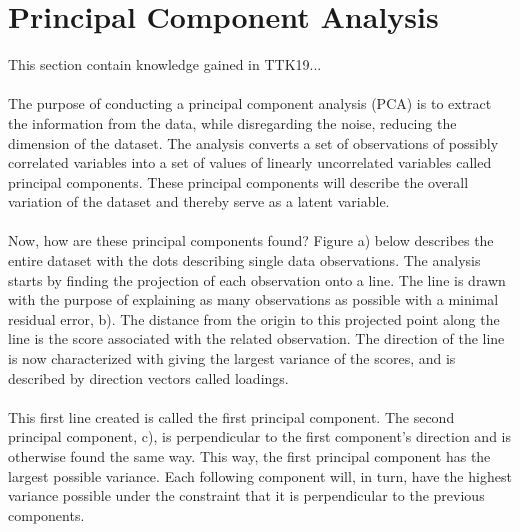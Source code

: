 \section{Principal Component Analysis} \label{sec:pca}
This section contain knowledge gained in TTK19...
\\\\
The purpose of conducting a principal component analysis (PCA) is to extract the information from the data, while disregarding the noise, reducing the dimension of the dataset. The analysis converts a set of observations of possibly correlated variables into a set of values of linearly uncorrelated variables called principal components. These principal components will describe the overall variation of the dataset and thereby serve as a latent variable. 
\\\\
Now, how are these principal components found? Figure a) below describes the entire dataset with the dots describing single data observations. The analysis starts by finding the projection of each observation onto a line. The line is drawn with the purpose of explaining as many observations as possible with a minimal residual error, b). The distance from the origin to this projected point along the line is the score associated with the related observation. The direction of the line is now characterized with giving the largest variance of the scores, and is described by direction vectors called loadings. 
\\\\
This first line created is called the first principal component. The second principal component, c), is perpendicular to the first component’s direction and is otherwise found the same way. This way, the first principal component has the largest possible variance. Each following component will, in turn, have the highest variance possible under the constraint that it is perpendicular to the previous components. 

